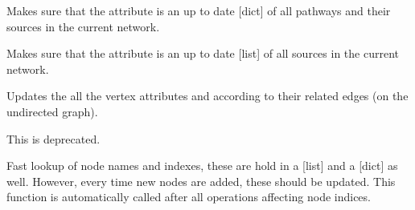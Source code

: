 \documentclass[letterpaper,10pt,english]{sphinxmanual}
\begin{document}
\begin{fulllineitems}
\begin{fulllineitems}
\end{fulllineitems}


\begin{fulllineitems}
\label{\detokenize{main:pypath.main.PyPath.update_pathways}}
Makes sure that the 
attribute is an up to date {[}dict{]} of all pathways and their
sources in the current network.

\end{fulllineitems}


\begin{fulllineitems}
\label{\detokenize{main:pypath.main.PyPath.update_sources}}
Makes sure that the 
attribute is an up to date {[}list{]} of all sources in the current
network.

\end{fulllineitems}


\begin{fulllineitems}
\label{\detokenize{main:pypath.main.PyPath.update_vertex_sources}}
Updates the all the vertex attributes  and
 according to their related edges (on the
undirected graph).

\end{fulllineitems}


\begin{fulllineitems}
\label{\detokenize{main:pypath.main.PyPath.update_vindex}}
This is deprecated.

\end{fulllineitems}


\begin{fulllineitems}
\label{\detokenize{main:pypath.main.PyPath.update_vname}}
Fast lookup of node names and indexes, these are hold in a
{[}list{]} and a {[}dict{]} as well. However, every time new nodes are
added, these should be updated. This function is automatically
called after all operations affecting node indices.


\end{fulllineitems}
\end{fulllineitems}
\end{document}
